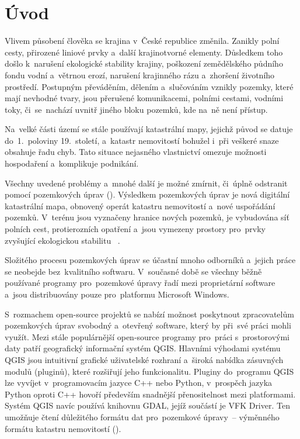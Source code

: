 \chapter{Úvod}
\label{1-uvod}

Vlivem působení člověka se krajina v~České republice změnila. Zanikly
polní cesty, přirozené liniové prvky a~další krajinotvorné
elementy. Důsledkem toho došlo k~naru\-šení ekologické stability
krajiny, poškození zemědělského půdního fondu vodní a~vě\-trnou erozí,
narušení krajinného rázu a~zhoršení životního prostředí. Postupným
převáděním, dělením a~slučováním vznikly pozemky, které mají nevhodné
tvary, jsou přerušené komunikacemi, polními cestami, vodními toky,
či~se~nachází uvnitř jiného bloku pozemků, kde na~ně není přístup.

Na~velké části území se stále používají katastrální mapy, jejichž
původ se datuje do~1.~poloviny 19.~století, a~katastr nemovitostí
bohužel i~při veškeré snaze obsahuje řadu chyb. Tato situace nejasného
vlastnictví omezuje možnosti hospodaření a~komplikuje podnikání.

Všechny uvedené problémy a~mnohé další je možné zmírnit, či~úplně
odstranit pomocí pozemkových úprav (). Výsledkem pozemkových
úprav je nová digi\-tální katastrální mapa, obnovený operát katastru
nemovitostí a~nové uspořádání pozemků. V~terénu jsou vyznačeny hranice
nových pozemků, je vybudována síť polních cest, protierozních opatření
a~jsou vymezeny prostory pro~prvky zvyšující ekologickou
stabilitu~\citep{pu_cr} \citep{pu_skripta}.

Složitého procesu pozemkových úprav se účastní mnoho odborníků
a~jejich práce se neobejde bez~kvalitního softwaru. V~současné době se
všechny běžně používané programy pro~pozemkové úpravy řadí mezi
proprietární software a~jsou distribuovány pouze pro~platformu Microsoft
Windows.

S~rozmachem open-source projektů se nabízí možnost poskytnout
zpracovatelům pozemkových úprav svobodný a~otevřený software, který by
při~své práci mohli využít. Mezi stále populárnější open-source
programy pro~práci s~prostorovými daty patří geografický informační
systém QGIS. Hlavními výhodami systému QGIS jsou intuitivní grafické
uživatelské rozhraní a~široká nabídka zásuvných modulů (pluginů),
které rozšiřují jeho funkcionalitu. Pluginy do~programu QGIS lze
vyvíjet v~programovacím jazyce C++ nebo Python, v~prospěch jazyka
Python oproti C++ ho\-voří především snadnější přenositelnost mezi
platformami. Systém QGIS navíc používá knihovnu GDAL, jejíž součástí
je VFK Driver. Ten umožňuje čtení důležitého formátu dat pro~pozemkové
úpravy~– výměnného formátu katastru nemovitostí ().

